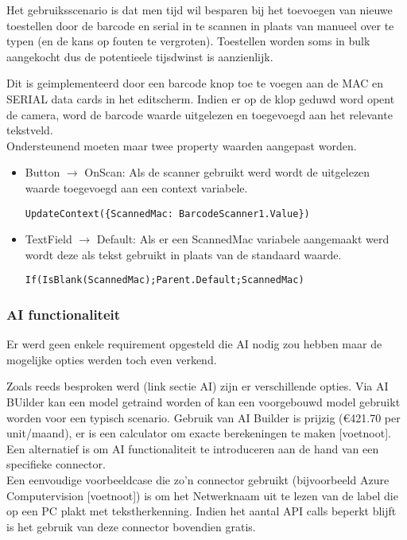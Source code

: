 Het gebruiksscenario is dat men tijd wil besparen bij het toevoegen van nieuwe toestellen door de barcode en serial in te scannen in plaats van manueel over te typen (en de kans op fouten te vergroten). Toestellen worden soms in bulk aangekocht dus de potentieele tijsdwinst is aanzienlijk.

Dit is geimplementeerd door een barcode knop toe te voegen aan de MAC en SERIAL data cards in het editscherm. Indien er op de klop geduwd word opent de camera, word de barcode waarde uitgelezen en toegevoegd aan het relevante tekstveld.\\
Ondersteunend moeten maar twee property waarden aangepast worden.
\begin{itemize}
    \item Button $\rightarrow$ OnScan: Als de scanner gebruikt werd wordt de uitgelezen waarde toegevoegd aan een context variabele.
\begin{lstlisting}
UpdateContext({ScannedMac: BarcodeScanner1.Value})
\end{lstlisting}
    \item TextField $\rightarrow$ Default: Als er een ScannedMac variabele aangemaakt werd wordt deze als tekst gebruikt in plaats van de standaard waarde.
\begin{lstlisting}
If(IsBlank(ScannedMac);Parent.Default;ScannedMac)
\end{lstlisting}    
\end{itemize}

\subsubsection{AI functionaliteit}

Er werd geen enkele requirement opgesteld die AI nodig zou hebben maar de mogelijke opties werden toch even verkend.

Zoals reeds besproken werd (link sectie AI) zijn er verschillende opties. Via AI BUilder kan een model getraind worden of kan een voorgebouwd model gebruikt worden voor een typisch scenario. Gebruik van AI Builder is prijzig (\euro 421.70 per unit/maand), er is een calculator om exacte berekeningen te maken [voetnoot]. Een alternatief is om AI functionaliteit te introduceren aan de hand van een specifieke connector.\\
Een eenvoudige voorbeeldcase die zo'n connector gebruikt (bijvoorbeeld Azure Computervision [voetnoot]) is om het Netwerknaam uit te lezen van de label die op een PC plakt met tekstherkenning. Indien het aantal API calls beperkt blijft is het gebruik van deze connector bovendien gratis.

